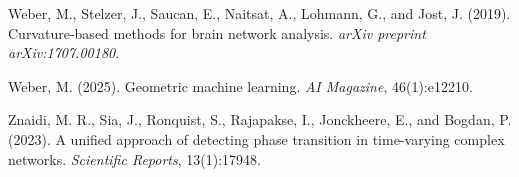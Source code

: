 \documentclass{article}
\theoremstyle{definition}
\begin{document}
\begin{thebibliography}{99}
Weber, M., Stelzer, J., Saucan, E., Naitsat, A., Lohmann, G., and Jost, J. (2019).
Curvature-based methods for brain network analysis.
\textit{arXiv preprint arXiv:1707.00180}.

Weber, M. (2025).
Geometric machine learning.
\textit{AI Magazine}, 46(1):e12210.

Znaidi, M. R., Sia, J., Ronquist, S., Rajapakse, I., Jonckheere, E., and Bogdan, P. (2023).
A unified approach of detecting phase transition in time-varying complex networks.
\textit{Scientific Reports}, 13(1):17948.

\end{thebibliography}
\end{document}
